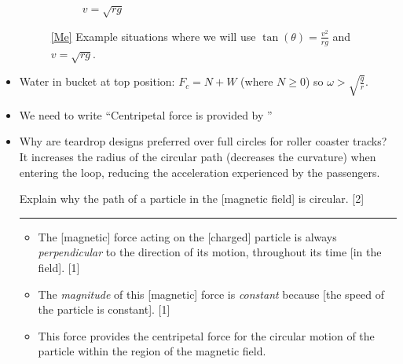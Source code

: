 \documentclass[oneside]{book}
\begin{document}
\begin{itemize}[label=\(\square\)]
\begin{figure}[H]
\begin{subfigure}[c]{0.35\textwidth}
            \vspace{0.5cm}
            \caption{\(v=\sqrt{rg}\)}
        \end{subfigure}%
        \caption{\ref{Me} Example situations where we will use \(\tan(\theta)=\frac{v^2}{rg}\) and \(v=\sqrt{rg}\).}
        \label{table:circular-motion-examples}
    \end{figure}
    \item Water in bucket at top position: \(F_c=N+W\) (where \(N\geq 0\)) so \(\omega>\sqrt{\frac{g}{r}}\).
    \item We need to write ``Centripetal force is provided by \underline{\hspace{1cm}}'' 
    \item Why are teardrop designs preferred over full circles for roller coaster tracks? It increases the radius of the circular path (decreases the curvature) when entering the loop, reducing the acceleration experienced by the passengers.
    \begin{example}{}{}
        Explain why the path of a particle in the [magnetic field] is circular. \hspace*{\fill} [2]
    
        \rule{20cm-137.0549pt-25pt}{0.05mm}\vspace{0.5\baselineskip}
        \begin{itemize}
            \item The [magnetic] force acting on the [charged] particle is always \emph{perpendicular} to the direction of its motion, throughout its time [in the field]. \hspace*{\fill} [1]
            \item The \emph{magnitude} of this [magnetic] force is \emph{constant} because [the speed of the particle is constant]. \hspace*{\fill} [1]
            \item This force provides the centripetal force for the circular motion of the particle within the region of the magnetic field. 
        \end{itemize}
    \end{example}
\end{itemize}
\end{document}
